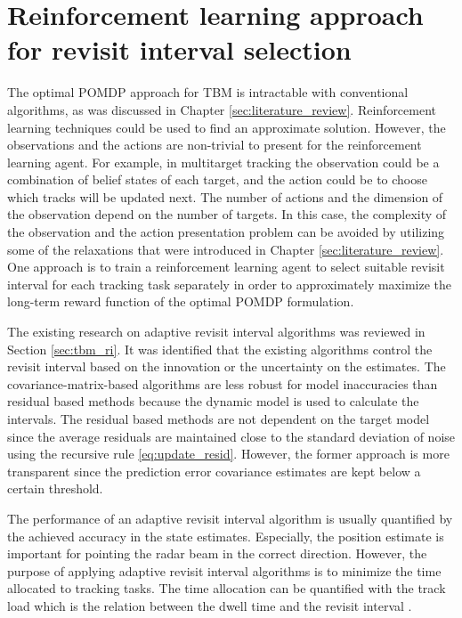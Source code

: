 \documentclass[english, 12pt, a4paper, elec, utf8, a-1b, online]{aaltothesis}
\begin{document}
\newpage
\section{Reinforcement learning approach for revisit interval selection}

The optimal POMDP approach for TBM is intractable with conventional algorithms, as was discussed in Chapter \ref{sec:literature_review}.
Reinforcement learning techniques could be used to find an approximate solution.
However, the observations and the actions are non-trivial to present for the reinforcement learning agent.
For example, in multitarget tracking the observation could be a combination of belief states of each target, and the action could be to choose which tracks will be updated next.
The number of actions and the dimension of the observation depend on the number of targets.
In this case, the complexity of the observation and the action presentation problem can be avoided by utilizing some of the relaxations that were introduced in Chapter \ref{sec:literature_review}.
One approach is to train a reinforcement learning agent to select suitable revisit interval for each tracking task separately in order to approximately maximize the long-term reward function of the optimal POMDP formulation.

The existing research on adaptive revisit interval algorithms was reviewed in Section \ref{sec:tbm_ri}.
It was identified that the existing algorithms control the revisit interval based on the innovation or the uncertainty on the estimates.
The covariance-matrix-based algorithms are less robust for model inaccuracies than residual based methods because the dynamic model is used to calculate the intervals.
The residual based methods are not dependent on the target model since the average residuals are maintained close to the standard deviation of noise using the recursive rule \eqref{eq:update_resid}.
However, the former approach is more transparent since the prediction error covariance estimates are kept below a certain threshold.

The performance of an adaptive revisit interval algorithm is usually quantified by the achieved accuracy in the state estimates.
Especially, the position estimate is important for pointing the radar beam in the correct direction.
However, the purpose of applying adaptive revisit interval algorithms is to minimize the time allocated to tracking tasks.
The time allocation can be quantified with the track load which is the relation between the dwell time and the revisit interval \cite{vanKeuk1993}.
\end{document}
